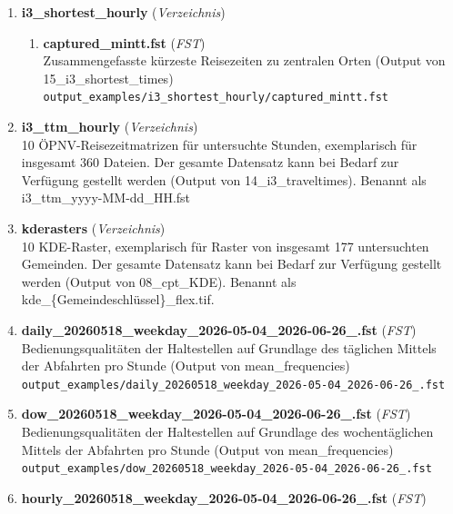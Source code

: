 \begin{enumerate}[label=\arabic*., leftmargin=*, itemsep=0.5em, topsep=0.3em]
\begin{enumerate}[label=\arabic{enumi}.\arabic*, leftmargin=*, itemsep=0.5em, topsep=0.3em]
\begin{enumerate}[label=\arabic{enumi}.\arabic{enumii}.\arabic*, leftmargin=*, itemsep=0.5em, topsep=0.3em]
Stundenmittel der Erschließungsqualität\\
\texttt{\small output\_examples/hourmean\_eq/results\_full\_hourmean.parquet}
\end{enumerate}
\item \textbf{i3\_shortest\_hourly} \textnormal{(\textit{Verzeichnis})}
\begin{enumerate}[label=\arabic{enumi}.\arabic{enumii}.\arabic*, leftmargin=*, itemsep=0.5em, topsep=0.3em]
\item \textbf{captured\_mintt.fst} \textnormal{(\textit{FST})}\\
Zusammengefasste kürzeste Reisezeiten zu zentralen Orten (Output von 15\_i3\_shortest\_times)\\
\texttt{\small output\_examples/i3\_shortest\_hourly/captured\_mintt.fst}
\end{enumerate}
\item \textbf{i3\_ttm\_hourly} \textnormal{(\textit{Verzeichnis})}\\
10 ÖPNV-Reisezeitmatrizen für untersuchte Stunden, exemplarisch für insgesamt 360 Dateien. Der gesamte Datensatz kann bei Bedarf zur Verfügung gestellt werden (Output von 14\_i3\_traveltimes).
Benannt als i3\_ttm\_yyyy-MM-dd\_HH.fst
\item \textbf{kderasters} \textnormal{(\textit{Verzeichnis})}\\
10 KDE-Raster, exemplarisch für Raster von insgesamt 177 untersuchten Gemeinden. Der gesamte Datensatz kann bei Bedarf zur Verfügung gestellt werden (Output von 08\_cpt\_KDE).
Benannt als kde\_\{Gemeindeschlüssel\}\_flex.tif.
\item \textbf{daily\_20260518\_weekday\_2026-05-04\_2026-06-26\_.fst} \textnormal{(\textit{FST})}\\
Bedienungsqualitäten der Haltestellen auf Grundlage des täglichen Mittels der Abfahrten pro Stunde (Output von mean\_frequencies)\\
\texttt{\small output\_examples/daily\_20260518\_weekday\_2026-05-04\_2026-06-26\_.fst}
\item \textbf{dow\_20260518\_weekday\_2026-05-04\_2026-06-26\_.fst} \textnormal{(\textit{FST})}\\
Bedienungsqualitäten der Haltestellen auf Grundlage des wochentäglichen Mittels der Abfahrten pro Stunde (Output von mean\_frequencies)\\
\texttt{\small output\_examples/dow\_20260518\_weekday\_2026-05-04\_2026-06-26\_.fst}
\item \textbf{hourly\_20260518\_weekday\_2026-05-04\_2026-06-26\_.fst} \textnormal{(\textit{FST})}\\

\end{enumerate}
\end{enumerate}

